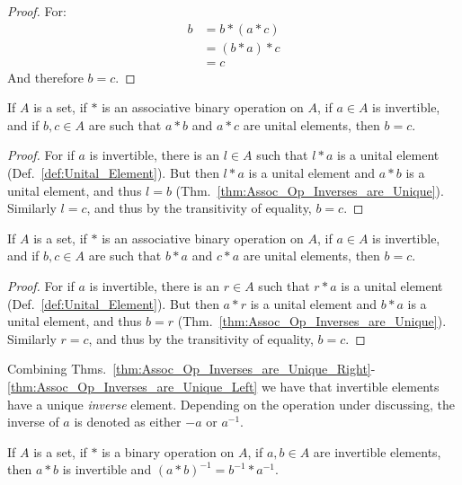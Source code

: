     \begin{proof}
        For:
        \begin{align}
            b&=b*(a*c)
            \tag{$a*b$ is a unital element}\\
            &=(b*a)*c
            \tag{Associativity}\\
            &=c
            \tag{$b*a$ is a unital element}
        \end{align}
        And therefore $b=c$.
    \end{proof}
    \begin{theorem}
        \label{thm:Assoc_Op_Inverses_are_Unique_Right}%
        If $A$ is a set, if $*$ is an associative binary operation on $A$, if
        $a\in{A}$ is invertible, and if $b,c\in{A}$ are such that $a*b$ and
        $a*c$ are unital elements, then $b=c$.
    \end{theorem}
    \begin{proof}
        For if $a$ is invertible, there is an $l\in{A}$ such that $l*a$ is a
        unital element (Def.~\ref{def:Unital_Element}). But then $l*a$ is a
        unital element and $a*b$ is a unital element, and thus $l=b$
        (Thm.~\ref{thm:Assoc_Op_Inverses_are_Unique}). Similarly $l=c$, and thus
        by the transitivity of equality, $b=c$.
    \end{proof}
    \begin{theorem}
        \label{thm:Assoc_Op_Inverses_are_Unique_Left}%
        If $A$ is a set, if $*$ is an associative binary operation on $A$, if
        $a\in{A}$ is invertible, and if $b,c\in{A}$ are such that $b*a$ and
        $c*a$ are unital elements, then $b=c$.
    \end{theorem}
    \begin{proof}
        For if $a$ is invertible, there is an $r\in{A}$ such that $r*a$ is a
        unital element (Def.~\ref{def:Unital_Element}). But then $a*r$ is a
        unital element and $b*a$ is a unital element, and thus $b=r$
        (Thm.~\ref{thm:Assoc_Op_Inverses_are_Unique}). Similarly $r=c$, and thus
        by the transitivity of equality, $b=c$.
    \end{proof}
    Combining Thms.~\ref{thm:Assoc_Op_Inverses_are_Unique_Right}-%
    \ref{thm:Assoc_Op_Inverses_are_Unique_Left} we have that invertible elements
    have a unique \textit{inverse} element. Depending on the operation under
    discussing, the inverse of $a$ is denoted as either $\minus{a}$ or
    $a^{\minus{1}}$.
    \begin{theorem}
        \label{thm:assoc_op_prod_of_inv_is_inv}%
        If $A$ is a set, if $*$ is a binary operation on $A$, if $a,b\in{A}$ are
        invertible elements, then $a*b$ is invertible and
        $(a*b)^{\minus{1}}=b^{\minus{1}}*a^{\minus{1}}$.
    \end{theorem}
